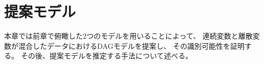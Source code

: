 
\section{提案モデル}
\label{part:proposal}

本章では前章で俯瞰した2つのモデル\cite{Shimizu2006-yu}\cite{Park2017-hw}を用いることによって、
連続変数と離散変数が混合したデータにおけるDAGモデルを提案し、
その識別可能性を証明する。
その後、提案モデルを推定する手法について述べる。

%

%

